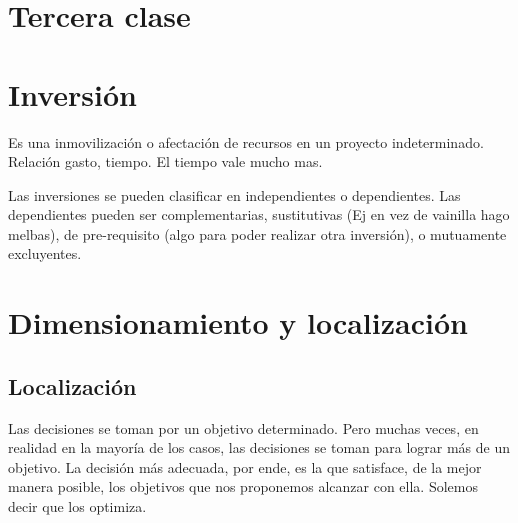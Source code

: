 \documentclass[titlepage,a4paper]{article}
\begin{document}



\section*{Tercera clase}

\section{Inversión}
Es una inmovilización o afectación de recursos en un proyecto indeterminado. Relación gasto, tiempo. El tiempo vale mucho mas.

Las inversiones se pueden clasificar en independientes o dependientes. Las dependientes pueden ser complementarias, sustitutivas (Ej en vez de vainilla hago melbas), de pre-requisito (algo para poder realizar otra inversión), o mutuamente excluyentes.

\section{Dimensionamiento y localización}


\subsection{Localización}
Las decisiones se toman por un objetivo determinado. Pero muchas veces, en realidad en la mayoría de los casos, las decisiones se toman para lograr más de un objetivo. La decisión más adecuada, por ende, es la que satisface, de la mejor manera posible, los objetivos que nos proponemos alcanzar con ella. Solemos decir que los optimiza.
\end{document}
